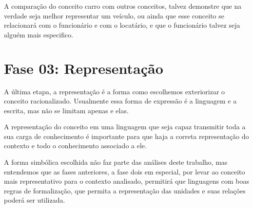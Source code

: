 A comparação do conceito carro com outros conceitos, talvez demonstre que na verdade seja melhor representar um veículo, ou ainda que esse conceito se relacionará com o funcionário e com o locatário, e que o funcionário talvez seja alguém mais especifico.

\section{\hspace*{3pt} Fase 03: Representação}
\label{sec:representacao}

A última etapa, a representação é a forma como escolhemos exteriorizar o conceito racionalizado. Usualmente essa forma de expressão é a linguagem e a escrita, mas não se limitam apenas e elas. 

A representação do conceito em uma linguagem que seja capaz transmitir toda a sua carga de conhecimento é importante para que haja a correta representação do contexto e todo o conhecimento associado a ele. 

A forma simbólica escolhida não faz parte das análises deste trabalho, mas entendemos que as fases anteriores, a fase dois em especial, por levar ao conceito mais representativo para o contexto analisado, permitirá que  linguagens com boas regras de formalização, que permita a representação das unidades e suas relações poderá ser utilizada.